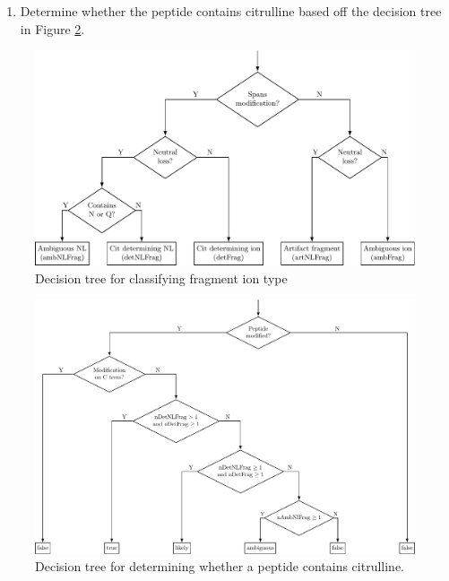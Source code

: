 \documentclass[12pt]{article}
\begin{document}
\begin{enumerate}
\begin{itemize}
\begin{itemize}
			\end{itemize}

		\end{itemize}

		\item Determine whether the peptide contains citrulline based off the decision tree in Figure \ref{fig:containsCit_tree}.  

	\end{enumerate}

	\begin{figure}[h!]
			\centering
			\includegraphics[width=\textwidth]{ionType_decision_tree.pdf}
			\caption{Decision tree for classifying fragment ion type}
			\label{fig:ionType_tree}
		\end{figure}

	\begin{figure}[h!]
		\centering
		\includegraphics[width=\textwidth]{containsCit_decision_tree.pdf}
		\caption{Decision tree for determining whether a peptide contains citrulline.}
		\label{fig:containsCit_tree}
	\end{figure}
\end{document}
